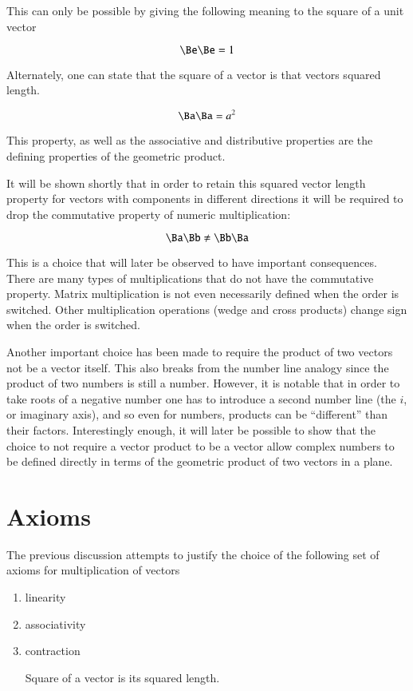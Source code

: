 This can only be possible by giving the following meaning to the square of a unit vector

\[
\Be \Be = 1
\]

Alternately, one can state that the square of a vector is that vectors squared length.

\[
\Ba \Ba = a^2
\]

This property, as well as the associative and distributive properties are the defining properties of the geometric product.  

It will be shown shortly that in order to retain this squared vector length property for vectors with components in different directions it will be required to drop the commutative property of numeric multiplication:

\[
\Ba \Bb \neq \Bb \Ba
\]

This is a choice that will later be observed to have important consequences.
There are many types of multiplications that do not have the commutative property.  Matrix multiplication is not even necessarily defined when the order is switched.  Other multiplication operations (wedge and cross products) change sign when the order is switched.

Another important choice has been made to require the product of two vectors not be a vector itself.  This also breaks
from the number line analogy since the product of two numbers is still a number.  However, it is
notable that 
in order to take roots of a negative number one has to introduce a second number line
(the $i$, or imaginary axis), and so even for numbers, products can be ``different'' than their factors.  
Interestingly enough,
it will later be possible to show that the choice to not require a vector product to be a vector
allow complex numbers to be defined directly in terms of the geometric product of two vectors in a plane.

\section{Axioms }

The previous discussion attempts to justify the choice of the following set of axioms for multiplication of vectors

\begin{enumerate}
\item{ linearity }
\item{ associativity }
\item{ contraction }

Square of a vector is its squared length.
\end{enumerate}

